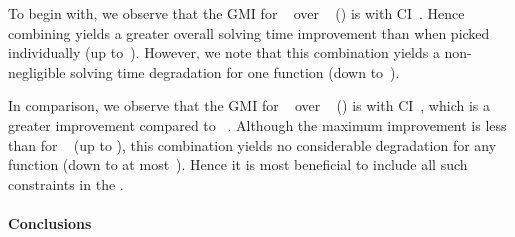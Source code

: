 To begin with, we observe that the \gls{GMI} for ~ over ~
() is \printGMI{%
  \SolvTechEnableOnlyGoodImpliedConsPrePlusSolvingTimeSpeedupPrePlusSolvingTimeRegularSpeedupGmean%
} with \gls{CI}~\printGMICI{%
  \SolvTechEnableOnlyGoodImpliedConsPrePlusSolvingTimeSpeedupPrePlusSolvingTimeRegularSpeedupCiMin%
}{%
  \SolvTechEnableOnlyGoodImpliedConsPrePlusSolvingTimeSpeedupPrePlusSolvingTimeRegularSpeedupCiMax%
}.
%
Hence combining  yields a greater overall solving time
improvement than when picked individually (up
to~\printSpeedup{%
  \SolvTechEnableOnlyGoodImpliedConsPrePlusSolvingTimeSpeedupPrePlusSolvingTimeZeroCenteredSpeedupMax%
}).
%
However, we note that this combination yields a non-negligible solving time
degradation for one \gls{function} (down
to~\printSpeedup{%
  \SolvTechEnableOnlyGoodImpliedConsPrePlusSolvingTimeSpeedupPrePlusSolvingTimeZeroCenteredSpeedupMin%
}).

In comparison, we observe that the \gls{GMI} for ~ over ~
() is \printGMI{%
  \SolvTechDisableAllImpliedConsPrePlusSolvingTimeSpeedupPrePlusSolvingTimeRegularSpeedupGmean%
} with \gls{CI}~\printGMICI{%
  \SolvTechDisableAllImpliedConsPrePlusSolvingTimeSpeedupPrePlusSolvingTimeRegularSpeedupCiMin%
}{%
  \SolvTechDisableAllImpliedConsPrePlusSolvingTimeSpeedupPrePlusSolvingTimeRegularSpeedupCiMax%
}, which is a greater improvement compared to ~.
%
Although the maximum improvement is less than for ~ (up to
\printSpeedup{%
  \SolvTechDisableAllImpliedConsPrePlusSolvingTimeSpeedupPrePlusSolvingTimeZeroCenteredSpeedupMax%
}), this combination yields no considerable degradation for any \gls{function}
(down to at
most~\printSpeedup{%
  \SolvTechDisableAllImpliedConsPrePlusSolvingTimeSpeedupPrePlusSolvingTimeZeroCenteredSpeedupMin%
}).
%
Hence it is most beneficial to include all such \glspl{constraint} in the
.


\paragraph{Conclusions}

